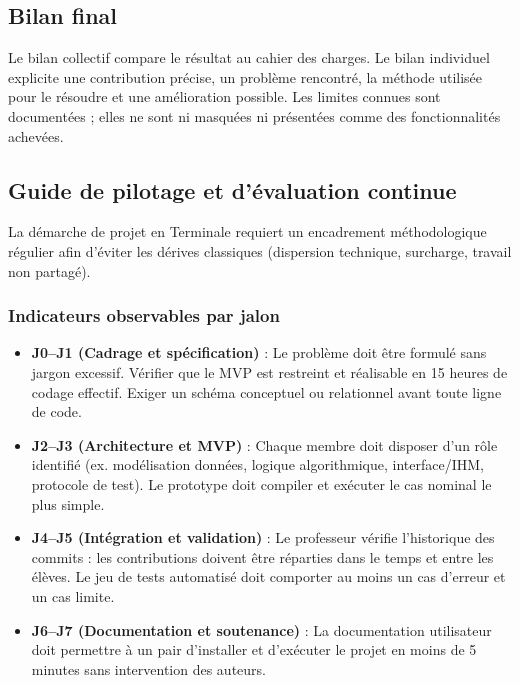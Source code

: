 \subsection*{Bilan final}

Le bilan collectif compare le résultat au cahier des charges. Le bilan individuel explicite
une contribution précise, un problème rencontré, la méthode utilisée pour le résoudre et
une amélioration possible. Les limites connues sont documentées ; elles ne sont ni masquées
ni présentées comme des fonctionnalités achevées.

\ifnxVersionProfesseur
{}

\subsection*{Guide de pilotage et d'évaluation continue}

La démarche de projet en Terminale requiert un encadrement méthodologique régulier afin d'éviter les dérives classiques (dispersion technique, surcharge, travail non partagé).

\subsubsection*{Indicateurs observables par jalon}
\begin{itemize}
  \item \textbf{J0--J1 (Cadrage et spécification)} : Le problème doit être formulé sans jargon excessif. Vérifier que le MVP est restreint et réalisable en 15 heures de codage effectif. Exiger un schéma conceptuel ou relationnel avant toute ligne de code.
  \item \textbf{J2--J3 (Architecture et MVP)} : Chaque membre doit disposer d'un rôle identifié (ex. modélisation données, logique algorithmique, interface/IHM, protocole de test). Le prototype doit compiler et exécuter le cas nominal le plus simple.
  \item \textbf{J4--J5 (Intégration et validation)} : Le professeur vérifie l'historique des commits : les contributions doivent être réparties dans le temps et entre les élèves. Le jeu de tests automatisé doit comporter au moins un cas d'erreur et un cas limite.
  \item \textbf{J6--J7 (Documentation et soutenance)} : La documentation utilisateur doit permettre à un pair d'installer et d'exécuter le projet en moins de 5 minutes sans intervention des auteurs.
\end{itemize}

